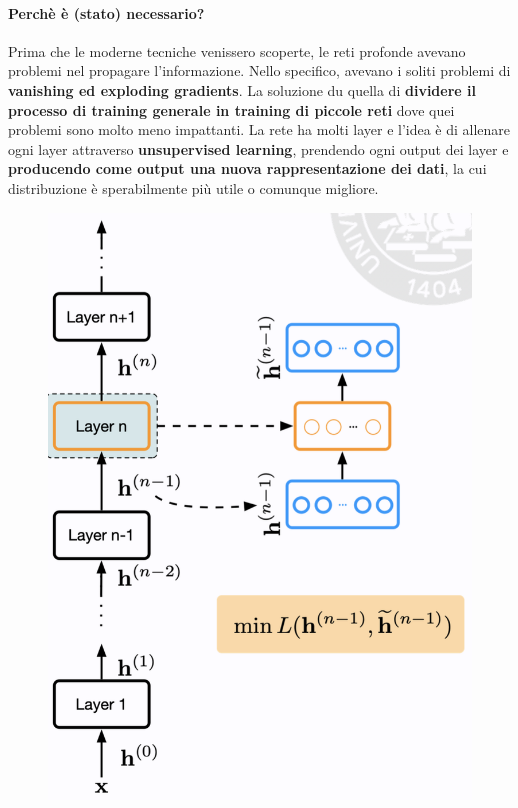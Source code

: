 \paragraph{Perchè è (stato) necessario?} Prima che le moderne tecniche venissero scoperte, le reti profonde
avevano problemi nel propagare l'informazione. Nello specifico, avevano i soliti problemi di \textbf{vanishing
ed exploding gradients}. La soluzione du quella di \textbf{dividere il processo di training generale in 
training di piccole reti} dove quei problemi sono molto meno impattanti.
\newline
\newline
La rete ha molti layer e l'idea è di allenare ogni layer attraverso \textbf{unsupervised learning}, prendendo
ogni output dei layer e \textbf{producendo come output una nuova rappresentazione dei dati}, 
la cui distribuzione è sperabilmente più utile o comunque migliore.
\begin{figure}[!h]
  \includegraphics[scale=.4]{images/representation_learning/greedy_layer_pre.png}
  \centering
\end{figure}


